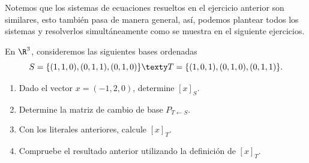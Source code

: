 \documentclass[a4,11pt]{aleph-notas}
\begin{document}
\begin{advertencia}
    Notemos que los sistemas de ecuaciones resueltos en el ejercicio anterior son similares, esto también pasa de manera general, así, podemos plantear todos los sistemas y resolverlos simultáneamente como se muestra en el siguiente ejercicios.
\end{advertencia}

\begin{ejer}
    En $\R^3$, consideremos las siguientes bases ordenadas
    \[
        S = \{(1,1,0),(0,1,1),(0,1,0)\}
        \texty
        T = \{(1,0,1),(0,1,0),(0,1,1)\}.
    \]
    \begin{enumerate}
    \item 
        Dado el vector $x = (-1,2,0)$, determine $[x]_S$.
    \item
        Determine la matriz de cambio de base $P_{T \leftarrow S}$.
    \item
        Con los literales anteriores, calcule $[x]_T$.
    \item
        Compruebe el resultado anterior utilizando la definición de $[x]_T$.
    \end{enumerate} 
\end{ejer}
\end{document}
